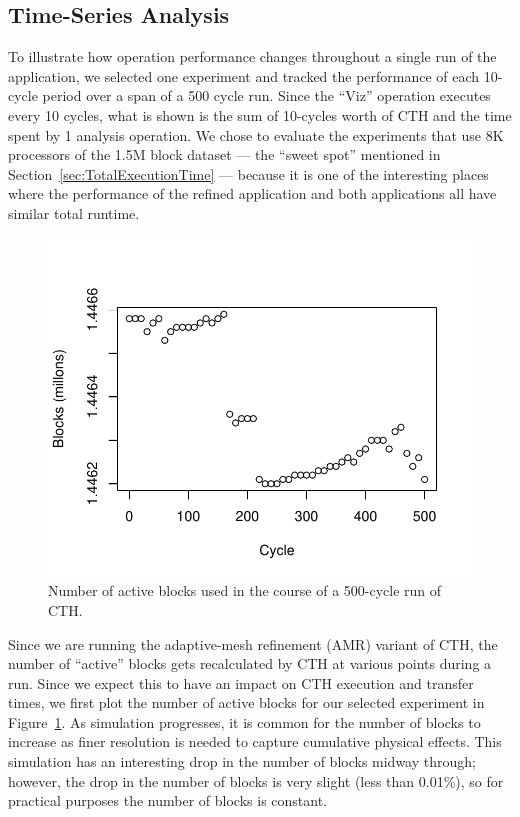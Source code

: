 \subsection{Time-Series Analysis}

To illustrate how operation performance changes throughout a single run
of the application, we selected one experiment and tracked the performance of
each 10-cycle period over a span of a 500 cycle run.  Since the ``Viz''
operation executes every 10 cycles, what is shown is the sum of 10-cycles worth
of CTH and the time spent by 1 analysis operation. We chose to evaluate
the experiments that use 8K processors of the 1.5M block dataset --- the ``sweet
spot'' mentioned in Section~\ref{sec:TotalExecutionTime} --- because it is one of
the interesting places where the performance of the refined \insitu application
and both \intransit applications all have similar total runtime.

\begin{figure}[tbp]
\begin{centering}
\includegraphics[scale=0.75]{figures/active-blocks-series}
\caption[Active Blocks]{Number of active blocks used in the course of a
500-cycle run of CTH.}
\label{fig:active-blocks}
\end{centering}
\end{figure}

Since we are running the adaptive-mesh refinement (AMR)
variant of CTH, the number of ``active'' blocks gets
recalculated by CTH at various points during a run. Since we expect this
to have an impact on CTH execution and \intransit transfer times, we first plot
the number of active blocks for our selected experiment in
Figure~\ref{fig:active-blocks}.  As simulation progresses, it is common for
the number of blocks to increase as finer resolution is needed to capture
cumulative physical effects.  This simulation has an interesting drop in
the number of blocks midway through; however, the drop in the number of
blocks is very slight (less than 0.01\%), so for practical purposes the
number of blocks is constant.

